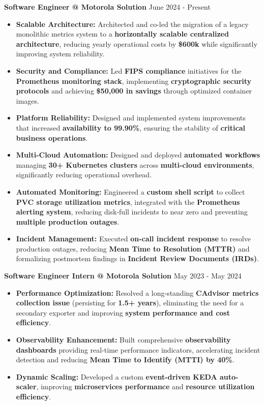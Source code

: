 \documentclass[a4paper,10pt]{article}
\newenvironment{joblong}[2]
    {
    \noindent\textbf{#1} \hfill #2 \par\vspace{3.50pt}
    \begin{itemize}[nosep, leftmargin=1em, itemsep=3pt,label=--]
    }
    {
    \end{itemize}
    \vspace{0.5em}
    }
\begin{document}
\begin{joblong}{Software Engineer @ Motorola Solution}{June 2024 - Present}
\item \textbf{Scalable Architecture:} Architected and co-led the migration of a legacy monolithic metrics system to a \textbf{horizontally scalable centralized architecture}, reducing yearly operational costs by \textbf{\$600k} while significantly improving system reliability.
\item \textbf{Security and Compliance:} Led \textbf{FIPS compliance} initiatives for the \textbf{Prometheus monitoring stack}, implementing \textbf{cryptographic security protocols} and achieving \textbf{\$50,000 in savings} through optimized container images.
\item \textbf{Platform Reliability:} Designed and implemented system improvements that increased \textbf{availability to 99.90\%}, ensuring the stability of \textbf{critical business operations}.
\item \textbf{Multi-Cloud Automation:} Designed and deployed \textbf{automated workflows} managing \textbf{30+ Kubernetes clusters} across \textbf{multi-cloud environments}, significantly reducing operational overhead.
\item \textbf{Automated Monitoring:} Engineered a \textbf{custom shell script} to collect \textbf{PVC storage utilization metrics}, integrated with the \textbf{Prometheus alerting system}, reducing disk-full incidents to near zero and preventing \textbf{multiple production outages}.
\item \textbf{Incident Management:} Executed \textbf{on-call incident response} to resolve production outages, reducing \textbf{Mean Time to Resolution (MTTR)} and formalizing postmortem findings in \textbf{Incident Review Documents (IRDs)}.
\end{joblong}
\begin{joblong}{Software Engineer Intern @ Motorola Solution}{May 2023 - May 2024}
\item \textbf{Performance Optimization:} Resolved a long-standing \textbf{CAdvisor metrics collection issue} (persisting for \textbf{1.5+ years}), eliminating the need for a secondary exporter and improving \textbf{system performance and cost efficiency}.
\item \textbf{Observability Enhancement:} Built comprehensive \textbf{observability dashboards} providing real-time performance indicators, accelerating incident detection and reducing \textbf{Mean Time to Identify (MTTI) by 40\%}.
\item \textbf{Dynamic Scaling:} Developed a custom \textbf{event-driven KEDA auto-scaler}, improving \textbf{microservices performance} and \textbf{resource utilization efficiency}.
\end{joblong}
\end{document}
